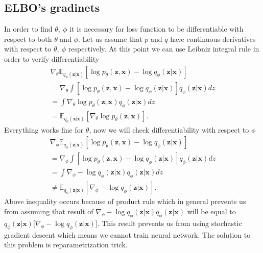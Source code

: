 \documentclass[10pt]{article}
\begin{document}
\subsection{ELBO's gradinets}
In order to find $\theta, \ \phi$ it is necessary for loss function to be differentiable with respect to both  $\theta$ and $\phi$. Let us assume that  $p$ and $q$ have continuous derivatives with respect to $\theta, \ \phi$ respectively. At this point we can use Leibniz integral rule in order to verify differentiability
\begin{gather}
    \nabla_{\theta} \mathbb{E}_{q_{\phi }(\textbf{z}|\textbf{x})}
    \left[ \log p_{\theta }(\textbf{z}, \textbf{x})  - \log q_{\phi }(\textbf{z}|\textbf{x}) \right] \\
    = \nabla_{\theta} \int \left[ \log p_{\theta }(\textbf{z}, \textbf{x})  - \log q_{\phi }(\textbf{z}|\textbf{x}) \right]  q_{\phi }(\textbf{z}|\textbf{x}) dz \\
    = \int \nabla_{\theta} \log p_{\theta }(\textbf{z}, \textbf{x})   q_{\phi }(\textbf{z}|\textbf{x}) dz \\
    =  \mathbb{E}_{q_{\phi }(\textbf{z}|\textbf{x})}
     \left[ \nabla_{\theta} \log p_{\theta }(\textbf{z}, \textbf{x})  \right].
\end{gather}
Everything works fine for $\theta$, now we will check differentiability with respect to $\phi$
\begin{gather}
    \nabla_{\phi} \mathbb{E}_{q_{\phi }(\textbf{z}|\textbf{x})}
    \left[ \log p_{\theta }(\textbf{z}, \textbf{x})  - \log q_{\phi }(\textbf{z}|\textbf{x}) \right] \\
    = \nabla_{\phi} \int \left[ \log p_{\theta }(\textbf{z}, \textbf{x})  - \log q_{\phi }(\textbf{z}|\textbf{x}) \right]  q_{\phi }(\textbf{z}|\textbf{x}) dz \\
    =\int \nabla_{\phi} -\log q_{\phi }(\textbf{z}|\textbf{x})  q_{\phi }(\textbf{z}|\textbf{x}) dz \\
     \neq  \mathbb{E}_{q_{\phi }(\textbf{z}|\textbf{x})}  
     \left[ \nabla_{\phi} -\log q_{\phi }(\textbf{z}|\textbf{x}) \right].
\end{gather}
Above inequality occurs because of product rule which in general prevents us from assuming that result of $\nabla_{\phi} -\log q_{\phi }(\textbf{z}|\textbf{x})  q_{\phi }(\textbf{z}|\textbf{x})$ will be equal to  $q_{\phi }(\textbf{z}|\textbf{x}) \big[ \nabla_{\phi} -\log q_{\phi }(\textbf{z}|\textbf{x}) \big] $. This result prevents us from using stochastic gradient descent which means we cannot train neural network. The solution to this problem is reparametrization trick.
\end{document}
